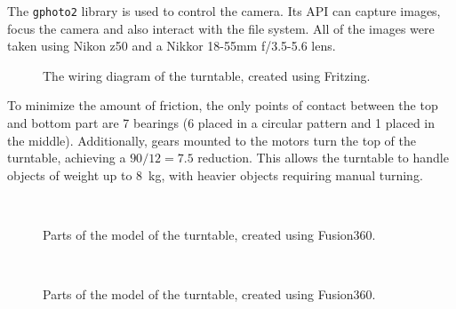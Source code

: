 The \verb|gphoto2| library is used to control the camera.
Its API can capture images, focus the camera and also interact with the file system.
All of the images were taken using Nikon z50 and a Nikkor 18-55mm f/3.5-5.6 lens.

\begin{figure}
	\centering
	
	\caption{The wiring diagram of the turntable, created using Fritzing.}
	\label{fig:wiring}
\end{figure}

To minimize the amount of friction, the only points of contact between the top and bottom part are 7 bearings (6 placed in a circular pattern and 1 placed in the middle).
Additionally, gears mounted to the motors turn the top of the turntable, achieving a $90/12 = 7.5$ reduction.
This allows the turntable to handle objects of weight up to \SI{8}{\kilo\gram}, with heavier objects requiring manual turning.

\begin{figure}
	\centering
	\hfill
	\hfill
	\\
	\qquad
	\qquad
	\qquad
	\hfill
	\qquad
	\qquad
	\qquad
	\caption{Parts of the model of the turntable, created using Fusion360.}%
	\label{fig:turntable}
\end{figure}

\begin{figure}
	\centering
	\hfill
	\\
	\hfill
	\caption{Parts of the model of the turntable, created using Fusion360.}%
	\label{fig:turntable}
\end{figure}

